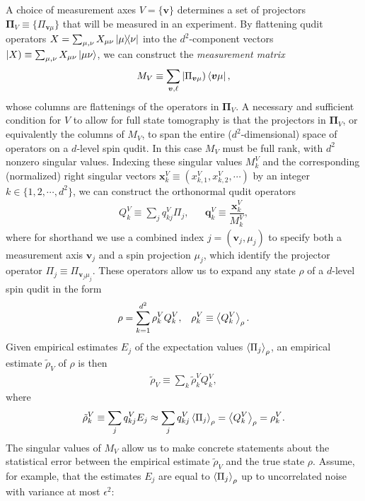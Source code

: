 \documentclass[notitlepage,twocolumn]{revtex4-2}
\newcommand{\f}[2]{\dfrac{#1}{#2}} %
\newcommand{\p}[1]{\left(#1\right)} %
\renewcommand{\set}[1]{\{#1\}} %
\newcommand{\bk}{\Braket} %
\renewcommand{\v}{\bm} %
\newcommand{\1}{\mathds{1}}
\def\oket#1{\mathinner{|{#1})}}
\begin{document}
A choice of measurement axes $V=\set{\v v}$ determines a set of projectors $\v\Pi_V \equiv \set{\Pi_{\v v\mu}}$ that will be measured in an experiment.
By flattening qudit operators $X = \sum_{\mu,\nu} X_{\mu\nu} \op{\mu}{\nu}$ into the $d^2$-component vectors $\oket{X} \equiv \sum_{\mu,\nu} X_{\mu\nu} \ket{\mu\nu}$, we can construct the {\it measurement matrix}
\begin{align}
  M_V \equiv \sum_{\v v,\ell} \oket{\Pi_{\v v\mu}} \bra{\v v\mu},
  \label{eq:meas_mat}
\end{align}
whose columns are flattenings of the operators in $\v\Pi_V$.
A necessary and sufficient condition for $V$ to allow for full state tomography is that the projectors in $\v\Pi_V$, or equivalently the columns of $M_V$, to span the entire ($d^2$-dimensional) space of operators on a $d$-level spin qudit.
In this case $M_V$ must be full rank, with $d^2$ nonzero singular values.
Indexing these singular values $M^V_k$ and the corresponding (normalized) right singular vectors $\v x^V_k\equiv(x^V_{k,1},x^V_{k,2},\cdots)$ by an integer $k\in\set{1,2,\cdots,d^2}$, we can construct the orthonormal qudit operators
\begin{align}
  Q^V_k \equiv \sum_j q^V_{kj} \Pi_j,
  &&
  \v q^V_k \equiv \f{\v x^V_k}{M^V_k},
\end{align}
where for shorthand we use a combined index $j=\p{\v v_j,\mu_j}$ to specify both a measurement axis $\v v_j$ and a spin projection $\mu_j$, which identify the projector operator $\Pi_j\equiv \Pi_{\v v_j\mu_j}$.
These operators allow us to expand any state $\rho$ of a $d$-level spin qudit in the form
\begin{align}
  \rho = \sum_{k=1}^{d^2} \rho_k^V Q_k^V,
  &&
  \rho_k^V \equiv \bk{Q^V_k}_\rho.
\end{align}
Given empirical estimates $E_j$ of the expectation values $\bk{\Pi_j}_\rho$, an empirical estimate $\tilde\rho_V$ of $\rho$ is then
\begin{align}
  \tilde\rho_V \equiv \sum_k \tilde\rho^V_k Q^V_k,
  \label{eq:reconstructed_state}
\end{align}
where
\begin{align}
  \tilde\rho^V_k \equiv \sum_j q^V_{kj} E_j
  \approx \sum_j q^V_{kj} \bk{\Pi_j}_\rho
  = \bk{Q^V_k}_\rho
  = \rho^V_k.
\end{align}
The singular values of $M_V$ allow us to make concrete statements about the statistical error between the empirical estimate $\tilde\rho_V$ and the true state $\rho$.
Assume, for example, that the estimates $E_j$ are equal to $\bk{\Pi_j}_\rho$ up to uncorrelated noise with variance at most $\epsilon^2$:
\end{document}

